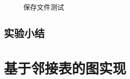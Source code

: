 \documentclass[supercite]{HustGraduPaper}
\theoremstyle{definition}
\begin{document}
\begin{enumerate}
\begin{figure}[htb]
		      \\
		      \caption{保存文件测试}
	      \end{figure}
\end{enumerate}
\newpage
\subsection{实验小结}


\newpage
\section{基于邻接表的图实现}
\end{document}
